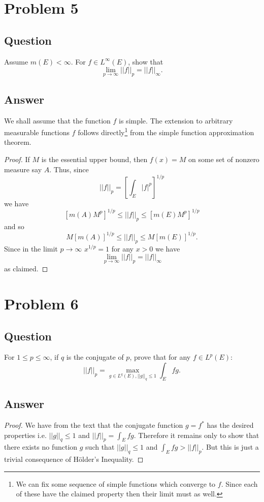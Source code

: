 \documentclass[10pt]{article}
\begin{document}
\section{Problem 5}
\subsection{Question}
Assume $m(E) < \infty$. For $f \in L^\infty (E)$, show that
\[\lim_{p \to \infty} ||f||_p = ||f||_\infty .\]
\subsection{Answer}
We shall assume that the function $f$ is simple. The extension to arbitrary measurable functions $f$ follows directly\footnote{We can fix some sequence of simple functions which converge to $f$. Since each of these have the claimed property then their limit must as well.} from the simple function approximation theorem.
\begin{proof}
If $M$ is the essential upper bound, then $f(x)=M$ on some set of nonzero measure say $A$. Thus, since
\[||f||_p  =  \left[ \int_E |f|^p \right] ^{1/p}  \]
we have
\[    \left[ m(A) M^p \right] ^{1/p}  \leq ||f||_p \leq    \left[ m(E) M^p \right] ^{1/p}  \]
and so
\[   M \left[ m(A)  \right] ^{1/p}  \leq ||f||_p \leq  M  \left[ m(E) \right] ^{1/p}  .\]
Since in the limit $p \to \infty$ $x^{1/p} =1 $ for any $ x  > 0 $ we have
\[\lim_{p \to \infty} ||f||_p = ||f||_\infty \]
as claimed.
\end{proof}

\section{Problem 6}
\subsection{Question}
For $1 \leq p \leq \infty$, if $q$ is the conjugate of $p$, prove that for any $f \in L^p(E)$:
\[||f||_p = \max_{g \in L^q(E), ||g||_q \leq 1 } \int_E fg .\]
\subsection{Answer}
\begin{proof}We have from the text that the conjugate function $g=f^*$ has the desired properties i.e. $||g||_q \leq 1$ and $||f||_p = \int_E f g$. Therefore it remains only to show that there exists no function $g$ such that $||g||_q \leq 1$ and $\int_E fg > ||f||_p$. But this is just a trivial consequence of H\"older's Inequality.\end{proof}
\end{document}
